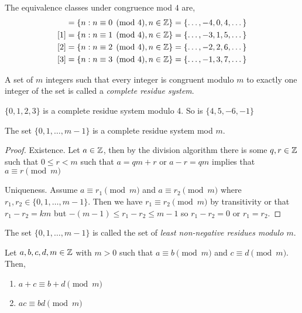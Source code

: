 \begin{eg}
    The equivalence classes under congruence mod  $4$ are,  
    \begin{align*}
    [0] &=  \{n: n \equiv 0 \pmod 4, n \in \Z\} = \{\dots, -4, 0, 4, \dots\}\\
    [1] &=  \{n: n \equiv 1 \pmod 4, n \in \Z\} = \{\dots, -3, 1, 5, \dots\}\\
    [2] &=  \{n: n \equiv 2 \pmod 4, n \in \Z\} = \{\dots, -2, 2, 6, \dots\}\\
    [3] &=  \{n: n \equiv 3 \pmod 4, n \in \Z\} = \{\dots, -1, 3, 7, \dots\}
    \end{align*}
\end{eg}

\begin{definition}[Residue]
    A set of $m$ integers such that every integer is congruent modulo  $m$ to exactly one integer of the set is called a \emph{complete residue system}.
\end{definition}
\begin{eg}
    $\{0, 1, 2, 3\}$ is a complete residue system modulo 4. So is $\{4, 5, -6, -1\}$
\end{eg}
\begin{prop}
    The set $\{0, 1, \dots, m - 1\} $  is a complete residue system mod $m$.
\end{prop}
\begin{proof}
    Existence. Let $a \in \mathbb{Z}$, then by the division algorithm there is some $q, r \in \mathbb{Z}$ such that  $0 \le r < m$ such that  $a = qm + r$ or  $a - r = qm$ implies that  $a \equiv r \pmod m$

    \vspace{1em}

    Uniqueness. Assume  $a \equiv r_1 \pmod m$ and $a \equiv r_2 \pmod m$ where $r_1,r_2 \in \{0, 1, \dots, m - 1\} $. Then we have $r_1 \equiv r_2 \pmod m$ by transitivity or that $r_1 - r_2 = km$ but $-(m - 1) \le r_1 - r_2 \le m - 1$ so $r_1 - r_2 = 0$ or $r_1 = r_2$.
\end{proof}

\begin{definition}
    The set $\{0, 1, \dots, m - 1\} $ is called the set of \emph{least non-negative residues modulo $m$}.
\end{definition}

\begin{prop}
   Let $a, b, c, d, m \in \mathbb{Z}$ with $m > 0$ such that  $a \equiv b \pmod m$ and  $c \equiv d \pmod m$. Then, 
   \begin{enumerate}
       \item $a + c \equiv b + d \pmod m$ 
       \item $ac \equiv bd \pmod m$
   \end{enumerate}
\end{prop}

